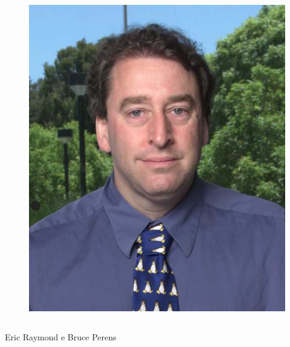 \documentclass[xcolor=dvipsnames]{beamer}
\begin{document}
\begin{frame}
\begin{columns}
\begin{column}[c]{4.5cm}
\begin{figure}
 	\includegraphics[scale=0.75]{perens.jpg}\\
 	\end{figure}
 \end{column}
 \end{columns}	
 \begin{center}Eric Raymond e Bruce Perens\end{center}
 \end{frame}
\end{document}
